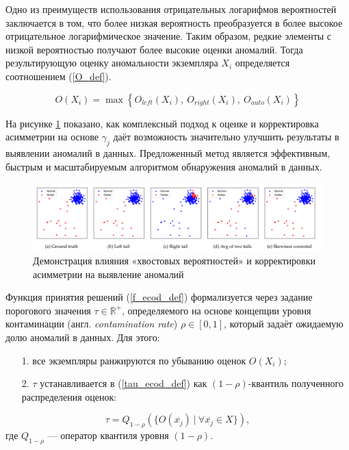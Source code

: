 Одно из преимуществ использования отрицательных логарифмов вероятностей заключается в том, что более низкая вероятность преобразуется в более высокое отрицательное логарифмическое значение. Таким образом, редкие элементы с низкой вероятностью получают более высокие оценки аномалий. Тогда результирующую оценку аномальности экземпляра $X_i$ определяется соотношением (\ref{O_def}).

\begin{equation}\label{O_def}
    O(X_i) = \max{ \left\{ O_{left}(X_i),\ O_{right}(X_i),\ O_{auto}(X_i) \right\} } 
\end{equation}


На рисунке \ref{fig:ecod-demo} показано, как комплексный подход к оценке и корректировка асимметрии на основе $\gamma_j$  даёт возможность значительно улучшить результаты в выявлении аномалий в данных. Предложенный метод является эффективным, быстрым и масштабируемым алгоритмом обнаружения аномалий в данных.

\begin{figure}
  \centering
  \includegraphics[scale=0.22]{inc/images/ecod-demo.png}
  \caption{Демонстрация влияния «хвостовых вероятностей» и корректировки асимметрии на выявление аномалий \cite{ECOD}}
  \label{fig:ecod-demo}
\end{figure} 

Функция принятия решений (\ref{f_ecod_def}) формализуется через задание порогового значения $\tau \in \mathbb{R}^+$, определяемого на основе концепции  уровня контаминации (англ. \textit{contamination rate}) $\rho \in [0,1]$, который задаёт ожидаемую долю аномалий в данных. Для этого:
\begin{enumerate}[leftmargin=0pt,itemindent=4.6em]
    \item[1.] все экземпляры ранжируются по убыванию оценок $O(X_i)$;
    \item[2.] $\tau$ устанавливается в (\ref{tau_ecod_def}) как $(1-\rho)$-квантиль полученного распределения оценок:
\end{enumerate}

\begin{equation}\label{tau_ecod_def}
    \tau = Q_{1-\rho}\left( \{ O(\overline{x_j}) \ |\ \forall \overline{x_j} \in X \} \right),
\end{equation}
где $Q_{1-\rho}$ --- оператор квантиля уровня $(1-\rho)$. 

